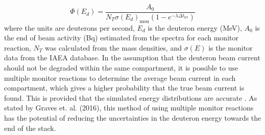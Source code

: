 \begin{equation} \label{eq:BC_simple}
    \Phi(E_d) = \frac{A_0}{N_T \sigma(E_d)_\text{mon}(1-e^{-\lambda \Delta t_\text{irr}})}
\end{equation}
\noindent 
where the units are deuterons per second, $E_d$ is the deuteron energy (MeV), $A_0$ is the end of beam activity (Bq) estimated from the spectra for each monitor reaction, $N_T$ was calculated from the mass densities, and $\sigma(E)$ is the monitor data from the IAEA database. In the assumption that the deuteron beam current should not be degraded within the same compartment, it is possible to use multiple monitor reactions to determine the average beam current in each compartment, which gives a higher probability that the true beam current is found. This is provided that the simulated energy distributions are accurate \cite{Graves2016}. As stated by Graves et. al. (2016), this method of using multiple monitor reactions has the potential of reducing the uncertainties in the deuteron energy towards the end of the stack. \\

